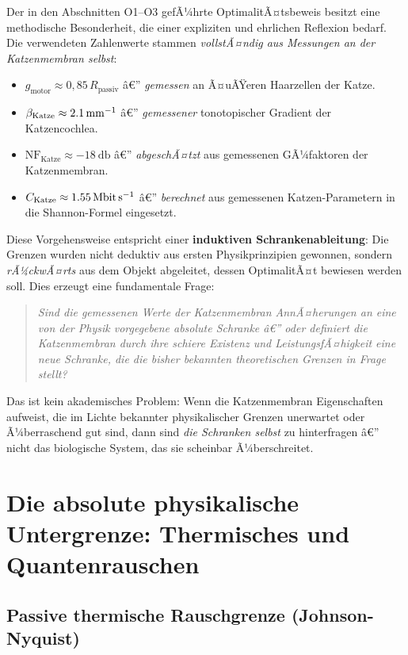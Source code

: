 ﻿\documentclass[12pt,a4paper,titlepage]{report}
\begin{document}
Der in den Abschnitten O1--O3 gefÃ¼hrte OptimalitÃ¤tsbeweis besitzt eine methodische
Besonderheit, die einer expliziten und ehrlichen Reflexion bedarf.
Die verwendeten Zahlenwerte stammen \emph{vollstÃ¤ndig aus Messungen an der
Katzenmembran selbst}:
\begin{itemize}[leftmargin=2em]
  \item $g_{\text{motor}} \approx 0{,}85\,R_{\text{passiv}}$ â€” \emph{gemessen} an
    Ã¤uÃŸeren Haarzellen der Katze.
  \item $\beta_{\text{Katze}} \approx \SI{2{,}1}{\milli\meter^{-1}}$ â€”
    \emph{gemessener} tonotopischer Gradient der Katzencochlea.
  \item $\mathrm{NF}_{\text{Katze}} \approx \SI{-18}{\decibel}$ â€”
    \emph{abgeschÃ¤tzt} aus gemessenen GÃ¼faktoren der Katzenmembran.
  \item $C_{\text{Katze}} \approx \SI{1{,}55}{\mega\bit\per\second}$ â€”
    \emph{berechnet} aus gemessenen Katzen-Parametern in die Shannon-Formel eingesetzt.
\end{itemize}
Diese Vorgehensweise entspricht einer \textbf{induktiven Schrankenableitung}: Die
Grenzen wurden nicht deduktiv aus ersten Physikprinzipien gewonnen, sondern
\emph{rÃ¼ckwÃ¤rts} aus dem Objekt abgeleitet, dessen OptimalitÃ¤t bewiesen werden soll.
Dies erzeugt eine fundamentale Frage:

\begin{quote}
  \itshape
  Sind die gemessenen Werte der Katzenmembran AnnÃ¤herungen an eine von der Physik
  vorgegebene absolute Schranke â€” oder definiert die Katzenmembran
  durch ihre schiere Existenz und LeistungsfÃ¤higkeit eine neue Schranke,
  die die bisher bekannten theoretischen Grenzen in Frage stellt?
\end{quote}

Das ist kein akademisches Problem: Wenn die Katzenmembran Eigenschaften aufweist,
die im Lichte bekannter physikalischer Grenzen unerwartet oder Ã¼berraschend gut sind,
dann sind \emph{die Schranken selbst} zu hinterfragen â€” nicht das biologische
System, das sie scheinbar Ã¼berschreitet.

\section{Die absolute physikalische Untergrenze: Thermisches und
Quantenrauschen}

\subsection{Passive thermische Rauschgrenze (Johnson-Nyquist)}
\end{document}
